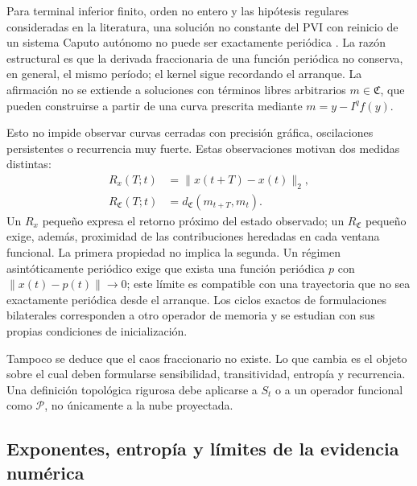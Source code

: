 Para terminal inferior finito, orden no entero y las hipótesis regulares
consideradas en la literatura, una solución no constante del PVI con reinicio
de un sistema Caputo autónomo no puede ser exactamente periódica
\cite{TavazoeiHaeri2009,KaslikSivasundaram2012}. La razón estructural es que la
derivada fraccionaria de una función periódica no conserva, en general, el
mismo período; el kernel sigue recordando el arranque.
La afirmación no se extiende a soluciones con términos libres arbitrarios
\(m\in\mathfrak C\), que pueden construirse a partir de una curva
prescrita mediante \(m=y-I^qf(y)\).

Esto no impide observar curvas cerradas con precisión gráfica, oscilaciones
persistentes o recurrencia muy fuerte. Estas observaciones motivan dos medidas
distintas:
\begin{align}
 R_x(T;t)&=\|x(t+T)-x(t)\|_2,
 \label{eq:geofo-point-recurrence}\\
 R_{\mathfrak C}(T;t)&=
 d_{\mathfrak C}(m_{t+T},m_t).
 \label{eq:geofo-memory-recurrence}
\end{align}
Un \(R_x\) pequeño expresa el retorno próximo del estado observado; un
\(R_{\mathfrak C}\) pequeño exige, además, proximidad de las
contribuciones heredadas en cada ventana funcional. La primera propiedad no
implica la segunda. Un régimen asintóticamente periódico exige que exista
una función periódica \(p\) con \(\|x(t)-p(t)\|\to0\); este límite es
compatible con una trayectoria que no sea exactamente periódica desde el
arranque. Los ciclos exactos de formulaciones bilaterales corresponden a
otro operador de memoria y se estudian con sus propias condiciones de
inicialización.

Tampoco se deduce que el caos fraccionario no existe. Lo que cambia es el
objeto sobre el cual deben formularse sensibilidad, transitividad, entropía y
recurrencia. Una definición topológica rigurosa debe aplicarse a \(S_t\) o a un
operador funcional como \(\mathcal P\), no únicamente a la nube proyectada.

\subsection{Exponentes, entropía y límites de la evidencia numérica}

